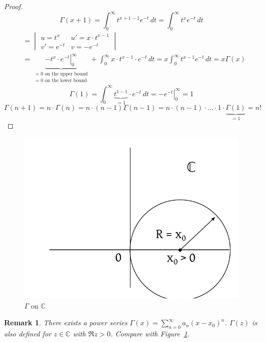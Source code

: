 \documentclass{article}
\newtheorem{remark}{Remark}  \numberwithin{remark}{section}
\begin{document}
\begin{proof}
  \[ \Gamma(x + 1) = \int_0^\infty t^{x+1-1} e^{-t} \, dt = \int_0^\infty t^{x} e^{-t} \, dt \]
  \begin{align*}
    &= \begin{vmatrix} u = t^x & u' = x \cdot t^{x-1} \\ v' = e^{-t} & v = -e^{-t} \end{vmatrix} \\
    &= \underbrace{\left. -t^x \cdot e^{-t} \right|_0^\infty}_{\substack{= 0 \text{ on the upper bound} \\ = 0 \text{ on the lower bound}}}
    + \int_0^\infty x \cdot t^{x-1} \cdot e^{-t} \, dt = x \int_0^\infty t^{x-1} e^{-t} \, dt = x \Gamma(x)
  \end{align*}
  \[ \Gamma(1) = \int_0^\infty \underbrace{t^{1-1}}_{=1} \cdot e^{-t} \, dt = \left. -e^{-t} \right|_0^\infty = 1 \]
  \[ \Gamma(n+1) = n \cdot \Gamma(n) = n \cdot (n - 1) \Gamma(n-1) = n \cdot (n-1) \cdot \ldots \cdot 1 \cdot \underbrace{\Gamma(1)}_{=1} = n! \]
\end{proof}

\begin{figure}[t]
  \begin{center}
    \includegraphics{img/22_gamma_on_C.pdf}
    \caption{$\Gamma$ on $\mathbb C$}
    \label{img:gamma}
  \end{center}
\end{figure}

\begin{remark}
  There exists a power series $\Gamma(x) = \sum_{n=0}^\infty a_n (x - x_0)^n$.
  $\Gamma(z)$ is also defined for $z \in \mathbb C$ with $\Re{z} > 0$.
  Compare with Figure~\ref{img:gamma}.
\end{remark}
\end{document}
